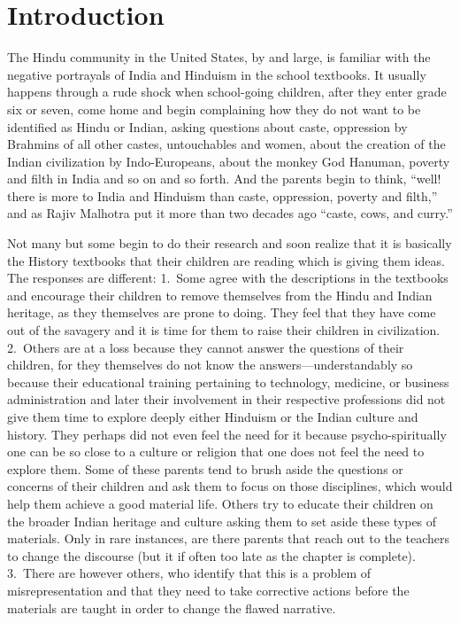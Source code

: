 \chapter{Introduction}


The Hindu community in the United States, by and large, is familiar with the negative portrayals of India and Hinduism in the school textbooks. It usually happens through a rude shock when school-going children, after they enter grade six or seven, come home and begin complaining how they do not want to be identified as Hindu or Indian, asking questions about caste, oppression by Brahmins of all other castes, untouchables and women, about the creation of the Indian civilization by Indo-Europeans, about the monkey God Hanuman, poverty and filth in India and so on and so forth. And the parents begin to think, “well! there is more to India and Hinduism than caste, oppression, poverty and filth,” and as Rajiv Malhotra put it more than two decades ago “caste, cows, and curry.”

Not many but some begin to do their research and soon realize that it is basically the History textbooks that their children are reading which is giving them ideas. The responses are different: 1.\ Some agree with the descriptions in the textbooks and encourage their children to remove themselves from the Hindu and Indian heritage, as they themselves are prone to doing. They feel that they have come out of the savagery and it is time for them to raise their children in civilization. 2.\ Others are at a loss because they cannot answer the questions of their children, for they themselves do not know the answers—understandably so because their educational training pertaining to technology, medicine, or business administration and later their involvement in their respective professions did not give them time to explore deeply either Hinduism or the Indian culture and history. They perhaps did not even feel the need for it because psycho-spiritually one can be so close to a culture or religion that one does not feel the need to explore them. Some of these parents tend to brush aside the questions or concerns of their children and ask them to focus on those disciplines, which would help them achieve a good material life. Others try to educate their children on the broader Indian heritage and culture asking them to set aside these types of materials. Only in rare instances, are there parents that reach out to the teachers to change the discourse (but it if often too late as the chapter is complete). 3.\ There are however others, who identify that this is a problem of misrepresentation and that they need to take corrective actions before the materials are taught in order to change the flawed narrative. 

